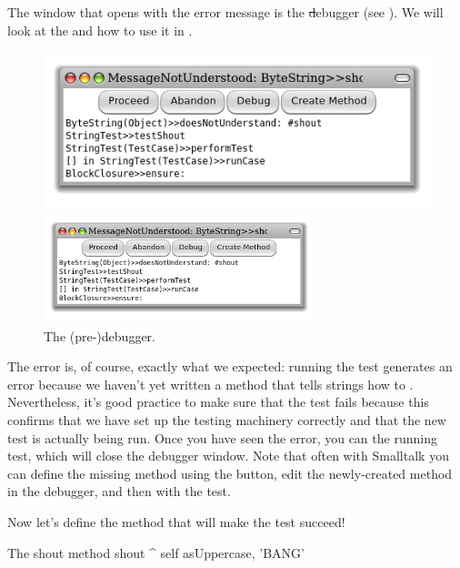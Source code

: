 \documentclass[a4paper,10pt,twoside]{book}
\begin{document}
The window that opens with the error message is the \st debugger (see ).
We will look at the  and how to use it in .

\begin{figure}[hbt]
\ifluluelse
	{\centerline {\includegraphics[width=\textwidth]{Predebugger}}}
	{\centerline {\includegraphics[width=0.7\textwidth]{Predebugger}}}
\caption{The (pre-)debugger.}
\label{fig:predebugger}
\end{figure}

The error is, of course, exactly what we expected:  running the test generates an error because we haven't yet written a method that tells strings how to .  
Nevertheless, it's good practice to make sure that the test fails because this confirms that we have set up the testing machinery correctly and that the new test is actually being run.
Once you have seen the error, you can  the running test, which will close the debugger window.
Note that often with Smalltalk you can define the missing method using the  button, edit the newly-created method in the debugger, and then  with the test.

Now let's define the method that will make the test succeed!

\begin{method}[shout]{The shout method}
shout
	^ self asUppercase, 'BANG'
\end{method}
\end{document}
